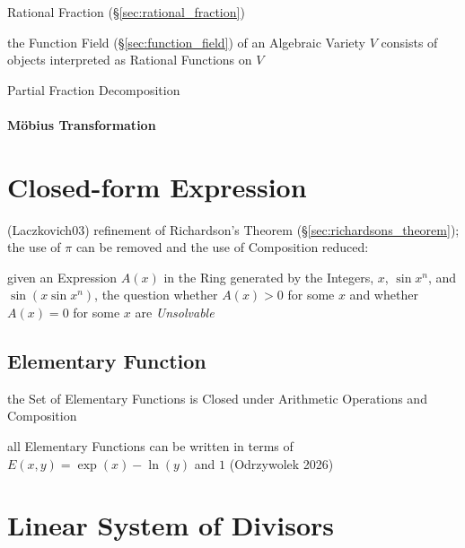 Rational Fraction (\S\ref{sec:rational_fraction})

the Function Field (\S\ref{sec:function_field}) of an Algebraic Variety $V$
consists of objects interpreted as Rational Functions on $V$

Partial Fraction Decomposition



\paragraph{M\"obius Transformation}\label{sec:mobius_transformation}\hfill




\section{Closed-form Expression}\label{sec:closed_form_expression}

(Laczkovich03) refinement of Richardson's Theorem
(\S\ref{sec:richardsons_theorem}); the use of $\pi$ can be removed and the use
of Composition reduced:

given an Expression $A(x)$ in the Ring generated by the Integers, $x$, $\sin
x^n$, and $\sin(x \sin x^n)$, the question whether $A(x) > 0$ for some $x$ and
whether $A(x) = 0$ for some $x$ are \emph{Unsolvable}



\subsection{Elementary Function}\label{sec:elementary_function}

the Set of Elementary Functions is Closed under Arithmetic Operations and
Composition

all Elementary Functions can be written in terms of $E(x,y) = \exp(x) - \ln(y)$
and $1$ (Odrzywolek 2026)



\section{Linear System of Divisors}\label{sec:linear_system_of_divisors}

